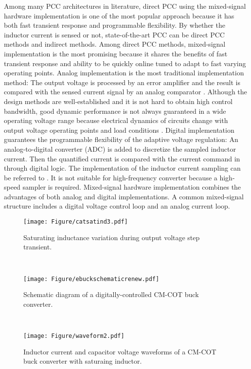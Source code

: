 Among many PCC architectures in literature, direct PCC using the mixed-signal hardware implementation is one of the most popular approach because it has both fast transient response and programmable flexibility. By whether the inductor current is sensed or not, state-of-the-art PCC can be direct PCC methods and indirect methods. Among direct PCC methods, mixed-signal implementation is the most promising because it shares the benefits of fast transient response and ability to be quickly online tuned to adapt to fast varying operating points. Analog implementation is the most traditional implementation method: The output voltage is processed by an error amplifier and the result is compared with the sensed current signal by an analog comparator \cite{Kaz2006tcs}. Although the design methods are well-established and it is not hard to obtain high control bandwidth, good dynamic performance is not always guaranteed in a wide operating voltage range because {\color{red} electrical dynamics} of circuits change with output voltage operating points and load conditions \cite{erikson2007}. Digital implementation guarantees the programmable flexibility of the adaptive voltage regulation: An analog-to-digital converter (ADC) is added to discretize the sampled inductor current. Then the quantified current is compared with the current command in through digital logic. The implementation of the inductor current sampling can be referred to \cite{Lilee2008APEC}. It is not suitable for high-frequency converter because a high-speed sampler is required. Mixed-signal hardware implementation \cite{Prodic2011tcs} \cite{santacobos2013tcs} combines the advantages of both analog and digital implementations. A common mixed-signal structure includes a digital voltage control loop and an analog current loop.

\begin{figure}
\begin{minipage}{0.32\textwidth}
    \centering
    \texttt{[image: Figure/catsatind3.pdf]}
    \caption{ \label{catonsatind} Saturating inductance variation during output voltage step transient.}
\end{minipage}
~
\begin{minipage}{0.32\textwidth}
    \centering
    \texttt{[image: Figure/ebuckschematicrenew.pdf]}
  \caption{  \label{circuitdiagram} Schematic diagram of a digitally-controlled CM-COT buck converter.}
\end{minipage}
~
\begin{minipage}{0.32\textwidth}
    \centering
    \texttt{[image: Figure/waveform2.pdf]}
    \caption{\label{eboostderivation} Inductor current and capacitor voltage waveforms of a CM-COT buck converter with saturaing inductor.}
\end{minipage}
\end{figure}


